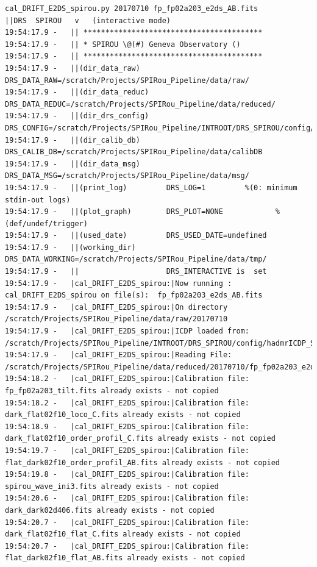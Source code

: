 \begin{lstlisting}[style=text]
cal_DRIFT_E2DS_spirou.py 20170710 fp_fp02a203_e2ds_AB.fits
||DRS  SPIROU   v   (interactive mode)
19:54:17.9 -   || *****************************************
19:54:17.9 -   || * SPIROU \@(#) Geneva Observatory ()
19:54:17.9 -   || *****************************************
19:54:17.9 -   ||(dir_data_raw)      DRS_DATA_RAW=/scratch/Projects/SPIRou_Pipeline/data/raw/
19:54:17.9 -   ||(dir_data_reduc)    DRS_DATA_REDUC=/scratch/Projects/SPIRou_Pipeline/data/reduced/
19:54:17.9 -   ||(dir_drs_config)    DRS_CONFIG=/scratch/Projects/SPIRou_Pipeline/INTROOT/DRS_SPIROU/config/
19:54:17.9 -   ||(dir_calib_db)      DRS_CALIB_DB=/scratch/Projects/SPIRou_Pipeline/data/calibDB
19:54:17.9 -   ||(dir_data_msg)      DRS_DATA_MSG=/scratch/Projects/SPIRou_Pipeline/data/msg/
19:54:17.9 -   ||(print_log)         DRS_LOG=1         %(0: minimum stdin-out logs)
19:54:17.9 -   ||(plot_graph)        DRS_PLOT=NONE            %(def/undef/trigger)
19:54:17.9 -   ||(used_date)         DRS_USED_DATE=undefined
19:54:17.9 -   ||(working_dir)       DRS_DATA_WORKING=/scratch/Projects/SPIRou_Pipeline/data/tmp/
19:54:17.9 -   ||                    DRS_INTERACTIVE is  set
19:54:17.9 -   |cal_DRIFT_E2DS_spirou:|Now running : cal_DRIFT_E2DS_spirou on file(s):  fp_fp02a203_e2ds_AB.fits
19:54:17.9 -   |cal_DRIFT_E2DS_spirou:|On directory /scratch/Projects/SPIRou_Pipeline/data/raw/20170710
19:54:17.9 -   |cal_DRIFT_E2DS_spirou:|ICDP loaded from: /scratch/Projects/SPIRou_Pipeline/INTROOT/DRS_SPIROU/config/hadmrICDP_SPIROU.py
19:54:17.9 -   |cal_DRIFT_E2DS_spirou:|Reading File: /scratch/Projects/SPIRou_Pipeline/data/reduced/20170710/fp_fp02a203_e2ds_AB.fits
19:54:18.2 -   |cal_DRIFT_E2DS_spirou:|Calibration file: fp_fp02a203_tilt.fits already exists - not copied
19:54:18.2 -   |cal_DRIFT_E2DS_spirou:|Calibration file: dark_flat02f10_loco_C.fits already exists - not copied
19:54:18.9 -   |cal_DRIFT_E2DS_spirou:|Calibration file: dark_flat02f10_order_profil_C.fits already exists - not copied
19:54:19.7 -   |cal_DRIFT_E2DS_spirou:|Calibration file: flat_dark02f10_order_profil_AB.fits already exists - not copied
19:54:19.8 -   |cal_DRIFT_E2DS_spirou:|Calibration file: spirou_wave_ini3.fits already exists - not copied
19:54:20.6 -   |cal_DRIFT_E2DS_spirou:|Calibration file: dark_dark02d406.fits already exists - not copied
19:54:20.7 -   |cal_DRIFT_E2DS_spirou:|Calibration file: dark_flat02f10_flat_C.fits already exists - not copied
19:54:20.7 -   |cal_DRIFT_E2DS_spirou:|Calibration file: flat_dark02f10_flat_AB.fits already exists - not copied

\end{lstlisting}
